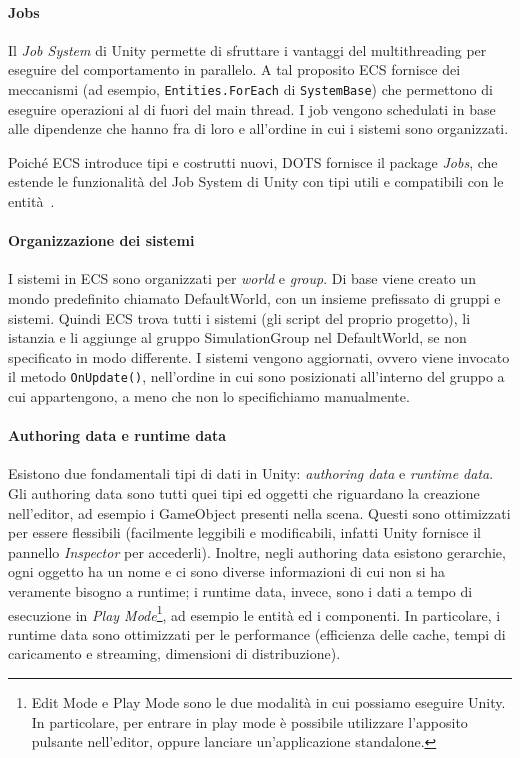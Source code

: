 \paragraph{Jobs}

Il \emph{\Csh{} Job System} di Unity permette di sfruttare i vantaggi del multithreading per eseguire del comportamento in parallelo. A tal proposito ECS fornisce dei meccanismi (ad esempio, \verb|Entities.ForEach| di \verb|SystemBase|) che permettono di eseguire operazioni al di fuori del main thread. I job vengono schedulati in base alle dipendenze che hanno fra di loro e all'ordine in cui i sistemi sono organizzati.

Poiché ECS introduce tipi e costrutti nuovi, DOTS fornisce il package \emph{Jobs}, che estende le funzionalità del \Csh{} Job System di Unity con tipi utili e compatibili con le entità~\cite{doc:unity-jobs}.

\paragraph{Organizzazione dei sistemi}

I sistemi in ECS sono organizzati per \emph{world} e \emph{group}. Di base viene creato un mondo predefinito chiamato DefaultWorld, con un insieme prefissato di gruppi e sistemi. Quindi ECS trova tutti i sistemi (gli script del proprio progetto), li istanzia e li aggiunge al gruppo SimulationGroup nel DefaultWorld, se non specificato in modo differente. I sistemi vengono aggiornati, ovvero viene invocato il metodo \verb|OnUpdate()|, nell'ordine in cui sono posizionati all'interno del gruppo a cui appartengono, a meno che non lo specifichiamo manualmente.

\paragraph{Authoring data e runtime data}

Esistono due fondamentali tipi di dati in Unity: \emph{authoring data} e \emph{runtime data}. Gli authoring data sono tutti quei tipi ed oggetti che riguardano la creazione nell'editor, ad esempio i GameObject presenti nella scena. Questi sono ottimizzati per essere flessibili (facilmente leggibili e modificabili, infatti Unity fornisce il pannello \emph{Inspector} per accederli). Inoltre, negli authoring data esistono gerarchie, ogni oggetto ha un nome e ci sono diverse informazioni di cui non si ha veramente bisogno a runtime; i runtime data, invece, sono i dati a tempo di esecuzione in \emph{Play Mode}\footnote{Edit Mode e Play Mode sono le due modalità in cui possiamo eseguire Unity. In particolare, per entrare in play mode è possibile utilizzare l'apposito pulsante nell'editor, oppure lanciare un'applicazione standalone.}, ad esempio le entità ed i componenti. In particolare, i runtime data sono ottimizzati per le performance (efficienza delle cache, tempi di caricamento e streaming, dimensioni di distribuzione).

